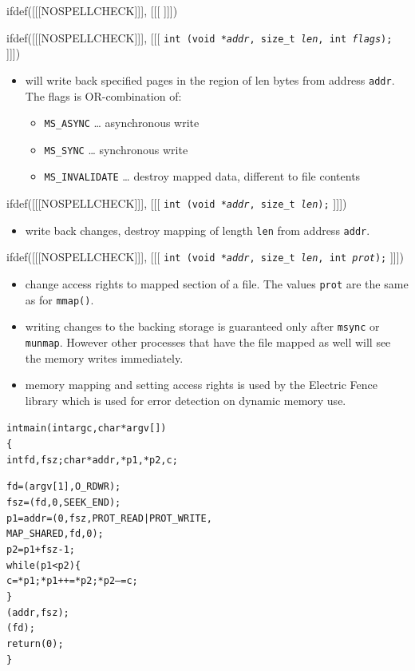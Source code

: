 
ifdef([[[NOSPELLCHECK]]], [[[
]]])

\begin{slide}
ifdef([[[NOSPELLCHECK]]], [[[
\texttt{int (void *\emph{addr}, size\_t \emph{l{}en},
int \emph{flags});}
]]])
\begin{itemize}
\item will write back specified pages in the region of l{}en bytes from address
\texttt{addr}. The flags is OR-combination of:
    \begin{itemize}
    \item \texttt{MS\_ASYNC} \dots{} asynchronous write
    \item \texttt{MS\_SYNC} \dots{} synchronous write
    \item \texttt{MS\_INVALIDATE} \dots{} destroy mapped data,
    different to file contents
    \end{itemize}
\end{itemize}
ifdef([[[NOSPELLCHECK]]], [[[
\texttt{int (void *\emph{addr}, size\_t \emph{l{}en});}
]]])
\begin{itemize}
\item write back changes, destroy mapping of length \texttt{l{}en} from
address \texttt{addr}.
\end{itemize}
ifdef([[[NOSPELLCHECK]]], [[[
\texttt{int (void *\emph{addr}, size\_t \emph{l{}en},
int \emph{prot});}
]]])
\begin{itemize}
\item change access rights to mapped section of a file. The values
\texttt{prot} are the same as for \texttt{mmap()}.
\end{itemize}
\end{slide}

\begin{itemize}
\item writing changes to the backing storage is guaranteed only after
\texttt{msync} or \texttt{munmap}.  However other processes that have the file
mapped as well will see the memory writes immediately.
\item memory mapping and setting access rights is used by the Electric Fence
library which is used for error detection on dynamic memory use.
\end{itemize}


\begin{slide}
\setlength{\baselineskip}{0.8\baselineskip}
\begin{alltt}
int main(int argc, char *argv[])
\{
    int fd, fsz; char *addr, *p1, *p2, c;

    fd = (argv[1], O\_RDWR);
    fsz = (fd, 0, SEEK\_END);
    p1 = addr = (0, fsz, PROT\_READ | PROT\_WRITE,
        MAP\_SHARED, fd, 0);
    p2 = p1 + fsz - 1;
    while(p1<p2) \{
            c = *p1; *p1++ = *p2; *p2-- = c;
    \}
    (addr, fsz); 
    (fd);
    return (0);
\}
\end{alltt}
\end{slide}

